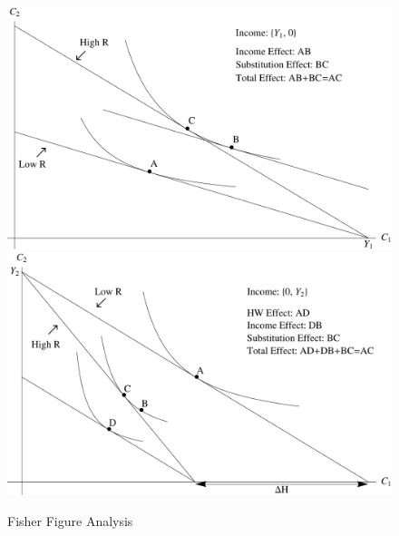 \documentclass{scrartcl}
\begin{document}
  \begin{figure}
    \caption{Fisher Figure Analysis}\label{fig:Fisher} \includegraphics[width=6in]{./Figures/FisherFigureY1} \includegraphics[width=6in]{./Figures/FisherFigureY2}
  \end{figure}



\end{document}
